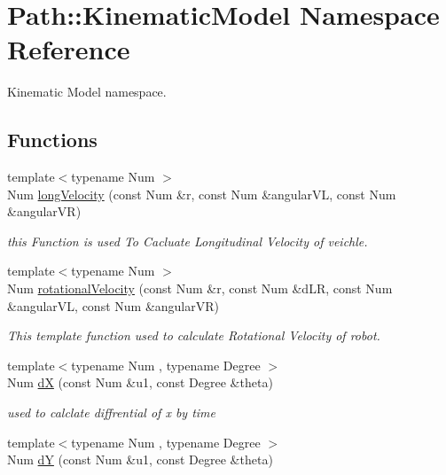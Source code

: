 \hypertarget{namespace_path_1_1_kinematic_model}{}\section{Path\+:\+:Kinematic\+Model Namespace Reference}
\label{namespace_path_1_1_kinematic_model}


Kinematic Model namespace.  


\subsection*{Functions}
\begin{DoxyCompactItemize}
\item 
{\footnotesize template$<$typename Num $>$ }\\Num \hyperlink{namespace_path_1_1_kinematic_model_a913b19ec3bbae4cd59f4567c069f9162}{long\+Velocity} (const Num \&r, const Num \&angular\+VL, const Num \&angular\+VR)
\begin{DoxyCompactList}\small\item\em this Function is used To Cacluate Longitudinal Velocity of veichle. \end{DoxyCompactList}\item 
{\footnotesize template$<$typename Num $>$ }\\Num \hyperlink{namespace_path_1_1_kinematic_model_a70c3d02758094a3fcaf68c64be01c1af}{rotational\+Velocity} (const Num \&r, const Num \&d\+LR, const Num \&angular\+VL, const Num \&angular\+VR)
\begin{DoxyCompactList}\small\item\em This template function used to calculate Rotational Velocity of robot. \end{DoxyCompactList}\item 
{\footnotesize template$<$typename Num , typename Degree $>$ }\\Num \hyperlink{namespace_path_1_1_kinematic_model_a2018f294ab353da7bbbe5dd332a40988}{dX} (const Num \&u1, const Degree \&theta)
\begin{DoxyCompactList}\small\item\em used to calclate diffrential of x by time \end{DoxyCompactList}\item 
{\footnotesize template$<$typename Num , typename Degree $>$ }\\Num \hyperlink{namespace_path_1_1_kinematic_model_a7e6878ff0311921c9cbf53df0c866a04}{dY} (const Num \&u1, const Degree \&theta)

\end{DoxyCompactItemize}
